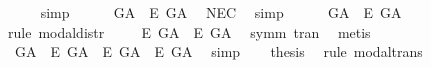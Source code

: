 \begin{isabellebody}
\ \ \ \ \isamarkupfalse%
\ simp\ %
\isanewline
\ \ \isamarkupfalse%
\ {\isachardoublequoteopen}{\isasymlfloor}\isactrlbold {\isasymbox}{\isacharparenleft}\isactrlbold {\isasymexists}\ G\isactrlsup A\ \isactrlbold {\isasymrightarrow}\ \isactrlbold {\isasymbox}\isactrlbold {\isasymexists}\isactrlsup E\ G\isactrlsup A{\isacharparenright}{\isasymrfloor}{\isachardoublequoteclose}\ \isamarkupfalse%
\ NEC\ \isamarkupfalse%
\ simp\isanewline
\ \ \isamarkupfalse%
\ {}{\isacharcolon}\ {\isachardoublequoteopen}{\isasymlfloor}\isactrlbold {\isasymdiamond}\isactrlbold {\isasymexists}\ G\isactrlsup A\ \isactrlbold {\isasymrightarrow}\ \isactrlbold {\isasymdiamond}\isactrlbold {\isasymbox}\isactrlbold {\isasymexists}\isactrlsup E\ G\isactrlsup A{\isasymrfloor}{\isachardoublequoteclose}\ \isamarkupfalse%
\ {\isacharparenleft}rule\ modal{\isacharunderscore}distr{\isacharparenright}\isanewline
\ \ \isamarkupfalse%
\ {}{\isacharcolon}\ {\isachardoublequoteopen}{\isasymlfloor}\isactrlbold {\isasymdiamond}\isactrlbold {\isasymbox}\isactrlbold {\isasymexists}\isactrlsup E\ G\isactrlsup A\ \isactrlbold {\isasymrightarrow}\ \isactrlbold {\isasymbox}\isactrlbold {\isasymexists}\isactrlsup E\ G\isactrlsup A{\isasymrfloor}{\isachardoublequoteclose}\ \isamarkupfalse%
\ symm\ tran\ \isamarkupfalse%
\ metis\isanewline
\ \ \isamarkupfalse%
\ {}\ {}\ \isamarkupfalse%
\ {\isachardoublequoteopen}{\isasymlfloor}\isactrlbold {\isasymdiamond}\isactrlbold {\isasymexists}\ G\isactrlsup A\ \isactrlbold {\isasymrightarrow}\ \isactrlbold {\isasymdiamond}\isactrlbold {\isasymbox}\isactrlbold {\isasymexists}\isactrlsup E\ G\isactrlsup A{\isasymrfloor}\ {\isasymand}\ {\isasymlfloor}\isactrlbold {\isasymdiamond}\isactrlbold {\isasymbox}\isactrlbold {\isasymexists}\isactrlsup E\ G\isactrlsup A\ \isactrlbold {\isasymrightarrow}\ \isactrlbold {\isasymbox}\isactrlbold {\isasymexists}\isactrlsup E\ G\isactrlsup A{\isasymrfloor}{\isachardoublequoteclose}\ \isamarkupfalse%
\ simp\isanewline
\ \ \isamarkupfalse%
\ {\isacharquery}thesis\ \isamarkupfalse%
\ {\isacharparenleft}rule\ modal{\isacharunderscore}trans{\isacharparenright}\isanewline
{}\isamarkupfalse%
%
\endisatagproof
{\isafoldproof}%
%
\isadelimproof
\isanewline
%
\endisadelimproof
\isanewline
{}\isamarkupfalse%

\end{isabellebody}

